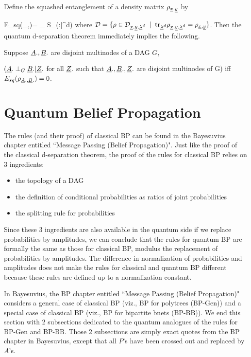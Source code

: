 \documentclass[12pt]{article}
\begin{document}
Define the squashed
entanglement
of a density
matrix $\rho_{{\underline{x}}, {\underline{y}}}$ by

\beq
E_{sq}(\rho_{\rvx,\rvy})=
\min_{\rho\in \cald}
S_\rho(\rvx:\rvy|\rvlam^d)
\eeq
where
${\cal D}=\{\rho
\in
{\cal D}_{{\underline{x}}, {\underline{y}}, {\underline{\lambda}}^d}\;\;|\;\;
{\rm tr }_{{\underline{\lambda}}^d}
\rho_{{\underline{x}},{\underline{y}}, {\underline{\lambda}}^d}
=
\rho_{{\underline{x}}, {\underline{y}}}
\}$.
Then the quantum 
d-separation
theorem immediately implies
the following.

\begin{claim}
Suppose
${\underline{A}}., {\underline{B}}.$
are disjoint multinodes
of a DAG  $G$,
 
(${\underline{A}}.\perp_G {\underline{B}}.|{\underline{Z}}.$ 
for all ${\underline{Z}}.$ such that
${\underline{A}}., {\underline{B}}., {\underline{Z}}.$
are disjoint multinodes of G)
iff
$E_{sq}(\rho_{{\underline{A}}., {\underline{B}}.})=0$.
\end{claim}


\section{Quantum Belief Propagation}

The rules
(and their proof)
of classical BP
can be found
in the Bayesuvius chapter
entitled ``Message
Passing (Belief Propagation)".
Just like
the proof
of the classical 
d-separation
theorem, 
the
proof
of the rules for classical BP
 relies on 3
ingredients:
\begin{itemize}
\item the topology
of a
DAG
\item
the definition
of conditional
probabilities 
as ratios of 
joint
probabilities
\item
the splitting rule
for probabilities
\end{itemize}
Since these
3 ingredients
are also
available
in the quantum
side
if we replace
probabilities
by amplitudes,
we can
conclude that
the rules
for quantum
BP
are formally 
the same as those
for classical BP,
modulus the
replacement of
probabilities
by
amplitudes.
The
difference in
normalization
of probabilities
and 
amplitudes
does not
make
the 
rules
for classical
and quantum
BP
different
because
these
rules
are defined up
to a normalization
constant.

In Bayesuvius, 
the BP chapter entitled ``Message Passing (Belief Propagation)"
considers a general case of classical BP (viz., BP for
polytrees (BP-Gen)) and a special case of classical
BP (viz., BP for bipartite bnets (BP-BB)).
We end this section
with 2 subsections dedicated
to the quantum
analogues of the rules
for BP-Gen and BP-BB.
Those 2 subsections
are simply exact quotes
from the BP chapter in
Bayesuvius,
except that
all $P$'s have been
crossed out and replaced by $A$'s.
\end{document}
